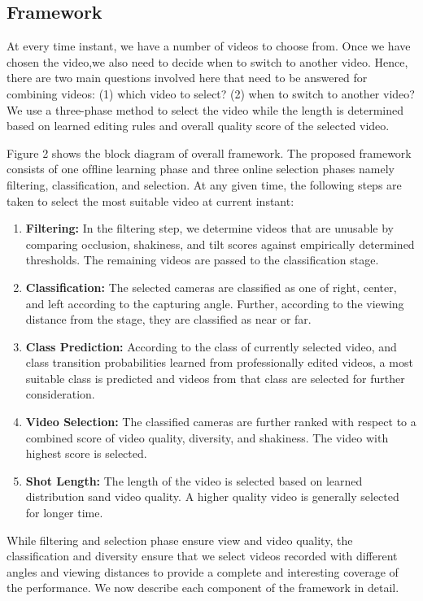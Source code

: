 \documentclass{sig-alternate}
\begin{document}
\subsection{Framework}
At every time instant, we have a number of videos to choose from. Once we have chosen the video,we also need to decide when to switch to another video. Hence, there are two main questions involved here that need to be answered for combining videos: (1) which video to select? (2) when to switch to another video? We use a three-phase method to select the video while the length is determined based on learned editing rules and overall quality score of the selected video. 

Figure 2 shows the block diagram of overall framework. The proposed framework consists of one ofﬂine learning phase and three online selection phases namely ﬁltering, classiﬁcation, and selection. At any given time, the following steps are taken to select the most suitable video at current instant:

\begin{enumerate}
\item  \textbf{Filtering:} In the ﬁltering step, we determine videos that are unusable by comparing occlusion, shakiness, and tilt scores against empirically determined thresholds. The remaining videos are passed to the classiﬁcation stage.
\item \textbf{Classiﬁcation:} The selected cameras are classiﬁed as one of right, center, and left according to the capturing angle. Further, according to the viewing distance from the stage, they are classiﬁed as near or far.
\item \textbf{Class Prediction:} According to the class of currently selected video, and class transition probabilities learned from professionally edited videos, a most suitable class is predicted and videos from that class are selected for further consideration.
\item \textbf{Video Selection:} The classiﬁed cameras are further ranked with respect to a combined score of video quality, diversity, and shakiness. The video with highest score is selected.
\item \textbf{Shot Length:} The length of the video is selected based on learned distribution sand video quality. A higher quality video is generally selected for longer time.
\end{enumerate}

While filtering and selection phase ensure view and video quality, the classification and diversity ensure that we select videos recorded with different angles and viewing distances to provide a complete and interesting coverage of the performance. We now describe each component of the framework in detail.
\end{document}
